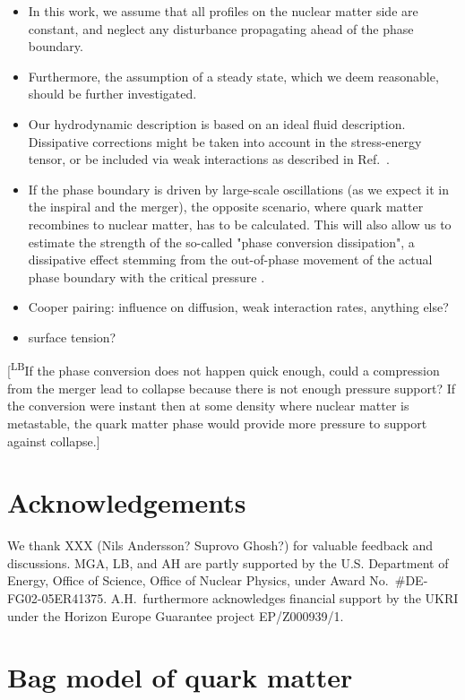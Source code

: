 \documentclass[10pt,superscriptaddress,
amsmath,aps,prc,twocolumn,nofootinbib,floatfix]{revtex4-1}
\newcommand{\LBcom}[1]{\textsf{\color{blue}[\textsuperscript{LB}#1]}}
\begin{document}
{\begin{itemize}[leftmargin=*]
    \item In this work, we assume that all profiles on the nuclear matter side are constant, and neglect any disturbance propagating ahead of the phase boundary. 
    \item Furthermore, the assumption of a steady state, which we deem reasonable, should be further investigated.
    \item Our hydrodynamic description is based on an ideal fluid description. Dissipative corrections might be taken into account in the stress-energy tensor, or be included via weak interactions as described in Ref.~\cite{Most:2022yhe}.
        \item If the phase boundary is driven by large-scale oscillations (as we expect it in the inspiral and the merger), the opposite scenario, where quark matter recombines to nuclear matter, has to be calculated. This will also allow us to estimate the strength of the so-called "phase conversion dissipation", a dissipative effect stemming from the out-of-phase movement of the actual phase boundary with the critical pressure \cite{Alford:2014jha}.
        \item Cooper pairing: influence on diffusion, weak interaction rates, anything else?
        \item surface tension?
\end{itemize}
}
\LBcom{If the phase conversion does not happen quick enough, could a compression from the merger lead to collapse because there is not enough pressure support? If the conversion were instant then at some density where nuclear matter is metastable, the quark matter phase would provide more pressure to support against collapse.}
\section*{Acknowledgements} We thank XXX (Nils Andersson? Suprovo Ghosh?) for valuable feedback and discussions.
MGA, LB, and AH are partly supported by the U.S. Department of Energy, Office of Science, Office of Nuclear Physics, under Award No.~\#DE-FG02-05ER41375. A.H.~furthermore acknowledges financial support by the UKRI under the Horizon Europe Guarantee project EP/Z000939/1.


\appendix
\section{Bag model of quark matter}
\label{sec:bag_model}
\end{document}

